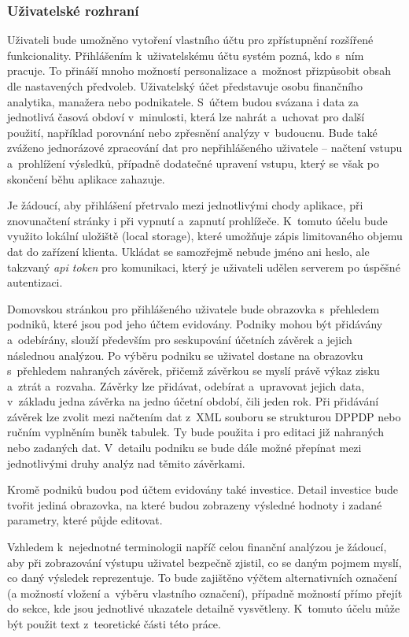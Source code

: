 \pagebreak
\subsubsection{Uživatelské rozhraní}


Uživateli bude umožněno vytoření vlastního účtu pro zpřístupnění rozšířené funkcionality. Přihlášením k~uživatelskému účtu systém pozná, kdo s~ním pracuje. To přináší mnoho možností personalizace a~možnost přizpůsobit obsah dle nastavených předvoleb. Uživatelský účet představuje osobu finančního analytika, manažera nebo podnikatele. S~účtem budou svázana i data za jednotlivá časová obdoví v~minulosti, která lze nahrát a~uchovat pro další použití, například porovnání nebo zpřesnění analýzy v~budoucnu. Bude také zváženo jednorázové zpracování dat pro nepřihlášeného uživatele -- načtení vstupu a~prohlížení výsledků, případně dodatečné upravení vstupu, který se však po skončení běhu aplikace zahazuje.

Je žádoucí, aby přihlášení přetrvalo mezi jednotlivými chody aplikace, při znovunačtení stránky i při vypnutí a~zapnutí prohlížeče. K~tomuto účelu bude využito lokální uložiště (local storage), které umožňuje zápis limitovaného objemu dat do zařízení klienta. Ukládat se samozřejmě nebude jméno ani heslo, ale takzvaný \textit{api token} pro komunikaci, který je uživateli udělen serverem po úspěšné autentizaci.

Domovskou stránkou pro přihlášeného uživatele bude obrazovka s~přehledem podniků, které jsou pod jeho účtem evidovány. Podniky mohou být přidávány a~odebírány, slouží především pro seskupování účetních závěrek a jejich následnou analýzou. Po výběru podniku se uživatel dostane na obrazovku s~přehledem nahraných závěrek, přičemž závěrkou se myslí právě výkaz zisku a~ztrát a~rozvaha. Závěrky lze přidávat, odebírat a~upravovat jejich data, v~základu jedna závěrka na jedno účetní období, čili jeden rok. Při přidávání závěrek lze zvolit mezi načtením dat z~XML souboru se strukturou DPPDP nebo ručním vyplněním buněk tabulek. Ty bude použita i pro editaci již nahraných nebo zadaných dat. V~detailu podniku se bude dále možné přepínat mezi jednotlivými druhy analýz nad těmito závěrkami.

Kromě podniků budou pod účtem evidovány také investice. Detail investice bude tvořit jediná obrazovka, na které budou zobrazeny výsledné hodnoty i zadané parametry, které půjde editovat.

Vzhledem k~nejednotné terminologii napříč celou finanční analýzou je žádoucí, aby při zobrazování výstupu uživatel bezpečně zjistil, co se daným pojmem myslí, co daný výsledek reprezentuje. To bude zajištěno výčtem alternativních označení (a možností vložení a~výběru vlastního označení), případně možností přímo přejít do sekce, kde jsou jednotlivé ukazatele detailně vysvětleny. K~tomuto účelu může být použit text z~teoretické části této práce.


